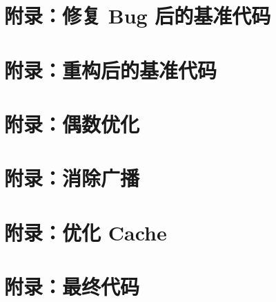 \documentclass[11pt]{article}
\begin{document}
  \pagebreak
  \appendix
  \lstset{
	  numbers=left,
  }

  \section{附录：修复 Bug 后的基准代码}
  \label{apd:fixed}
  
  \section{附录：重构后的基准代码}
  \label{apd:refactored}
  
  \section{附录：偶数优化}
  \label{apd:no_even}
  
  \section{附录：消除广播}
  \label{apd:no_cast}
  
  \section{附录：优化 Cache}
  \label{apd:better_cache}
  
  \section{附录：最终代码}
  \label{apd:final_version}
\end{document}
